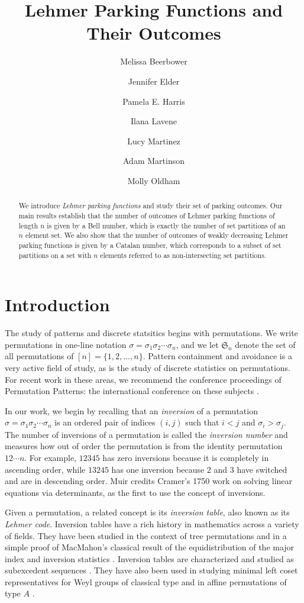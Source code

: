 \documentclass{amsart}
\author[Beerbower]{Melissa Beerbower}
\author[Elder]{Jennifer Elder}
\author[Harris]{Pamela E. Harris}
\author[Lavene]{Ilana Lavene}
\author[Martinez]{Lucy Martinez}
\author[Martinson]{Adam Martinson}
\author[Oldham]{Molly Oldham}
\theoremstyle{definition}
\theoremstyle{definition}
\theoremstyle{remark}
\begin{document}
\title{Lehmer Parking Functions and Their Outcomes}    



\begin{abstract}
We introduce \emph{Lehmer parking functions} and study their set of parking outcomes. Our main results establish that the number of outcomes of Lehmer parking functions of length $n$ is given by a Bell number, which is exactly the number of set partitions of an $n$ element set. We also show that the number of outcomes of weakly decreasing Lehmer parking functions is given by a Catalan number, which corresponds to a subset of set partitions on a set with $n$ elements referred to as non-intersecting set partitions.
\end{abstract}


\maketitle
\section{Introduction}
The study of patterns and discrete statsitics begins with permutations.
We write permutations in one-line notation $\sigma=\sigma_1\sigma_2\cdots\sigma_n$, and we let $\mathfrak{S}_n$ denote the set of all permutations of $[n]=\{1,2,\ldots,n\}$.
Pattern containment and avoidance is a very active field of study, as is the study of discrete statistics on permutations. For recent work in these areas, we recommend the conference proceedings of Permutation Patterns: the international conference on these subjects \cite{Perm_patterns_conf}. 

In our work, we begin by recalling that an \textit{inversion} of a permutation $\sigma=\sigma_1\sigma_2\cdots\sigma_n$ is an ordered pair of indices $(i,j)$ such that $i<j$ and $\sigma_i>\sigma_j$. 
The number of inversions of a permutation is called the \textit{inversion number} and measures how out of order the permutation is from the identity permutation $12\cdots n$. 
For example, $12345$ has zero inversions because it is completely in ascending order, while $13245$ has one inversion because $2$ and $3$ have switched and are in descending order.
Muir \cite{tmuir} credits Cramer's 1750 work \cite{gcramer} on solving linear equations via determinants, as the first to use the concept of inversions.


Given a permutation, a related concept is its \textit{inversion table}, also known as its \textit{Lehmer code}.
Inversion tables have a rich history in mathematics across a variety of fields. They have been studied in the context of tree permutations \cite{10.1145/100348.100370} and in a simple proof of MacMahon's classical result of the equidistribution of the major index and inversion statistics \cite{mjcollins}. 
Inversion tables are characterized and studied as subexcedent sequences \cite{MR3207475}. They have also been used in studying minimal left coset representatives for Weyl groups of classical type \cite{MR1834087} and in affine permutations of type $A$ \cite{MR1392503}. 
\end{document}
